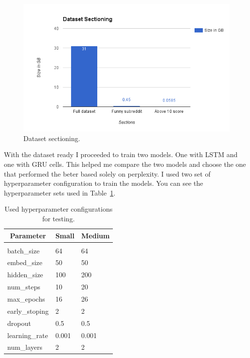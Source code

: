 \documentclass{article} %
\begin{document}
\begin{figure}[h]
\centering
\includegraphics[scale=0.5]{dataset_sectioning}
\caption{Dataset sectioning.}
\label{fig:datasetsection}
\end{figure}

With the dataset ready I proceeded to train two models. One with LSTM and one
with GRU cells. This helped me compare the two models and choose the one that
performed the beter based solely on perplexity. I used two set of hyperparameter
configuration to train the models. You can see the hyperparameter sets used in
Table~\ref{table:hyperparameters}.

\begin{table}[h]
\caption{Used hyperparameter configurations for testing.}
\label{table:hyperparameters}
\centering
\begin{tabular}{lll}
\multicolumn{1}{c}{\bf Parameter}  &\multicolumn{1}{c}{\bf Small}
&\multicolumn{1}{c}{\bf Medium}
\\ \hline \\
batch\_size         &64         &64 \\
embed\_size         &50         &50 \\
hidden\_size        &100        &200 \\
num\_steps          &10         &20 \\
max\_epochs         &16         &26 \\
early\_stoping      &2          &2 \\
dropout             &0.5        &0.5 \\
learning\_rate      &0.001      &0.001 \\
num\_layers         &2          &2 \\
\end{tabular}
\end{table}
\end{document}
